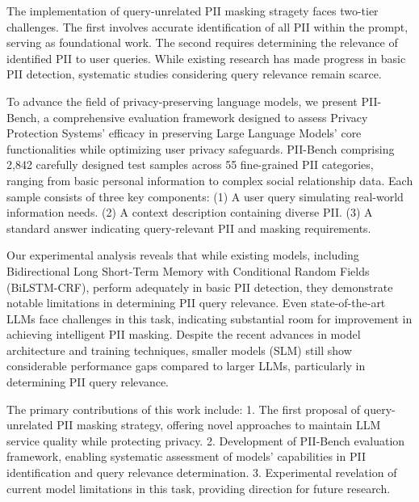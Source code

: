The implementation of query-unrelated PII masking stragety faces two-tier challenges.
The first involves accurate identification of all PII within the prompt, serving as foundational work. 
The second requires determining the relevance of identified PII to user queries. 
While existing research has made progress in basic PII detection, systematic studies considering query relevance remain scarce.

To advance the field of privacy-preserving language models, we present PII-Bench, a comprehensive evaluation framework designed to assess Privacy Protection Systems' efficacy in preserving Large Language Models' core functionalities while optimizing user privacy safeguards.
PII-Bench comprising 2,842 carefully designed test samples across 55 fine-grained PII categories, ranging from basic personal information to complex social relationship data. 
Each sample consists of three key components: 
(1) A user query simulating real-world information needs. 
(2) A context description containing diverse PII. 
(3) A standard answer indicating query-relevant PII and masking requirements.

Our experimental analysis reveals that while existing models, including  Bidirectional Long Short-Term Memory with Conditional Random Fields (BiLSTM-CRF), perform adequately in basic PII detection, they demonstrate notable limitations in determining PII query relevance.
Even state-of-the-art LLMs face challenges in this task, indicating substantial room for improvement in achieving intelligent PII masking. Despite the recent advances in model architecture and training techniques, smaller models (SLM) still show considerable performance gaps compared to larger LLMs, particularly in determining PII query relevance.

The primary contributions of this work include:
1. The first proposal of query-unrelated PII masking strategy, offering novel approaches to maintain LLM service quality while protecting privacy.
2. Development of PII-Bench evaluation framework, enabling systematic assessment of models' capabilities in PII identification and query relevance determination.
3. Experimental revelation of current model limitations in this task, providing direction for future research.
